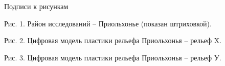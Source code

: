 \documentclass[runningheads]{AIIT}
\begin{document}
Подписи к рисункам

Рис. 1. Район исследований – Приольхонье (показан штриховкой).

Рис. 2. Цифровая модель пластики рельефа Приольхонья – рельеф X.

Рис. 3. Цифровая модель пластики рельефа Приольхонья – рельеф У.


%
%
 \begin{thebibliography}{99}

 \end{thebibliography}


%
%

\end{document}

